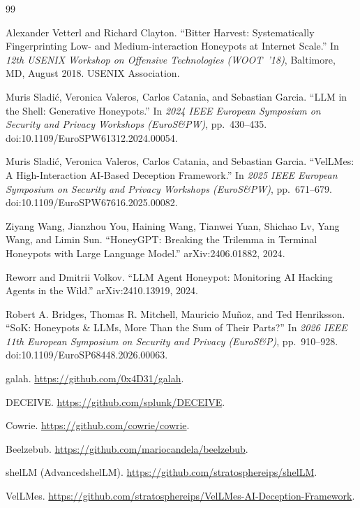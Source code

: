 \documentclass[a4paper,11pt]{article}
\begin{document}
\begin{thebibliography}{99}

Alexander Vetterl and Richard Clayton. ``Bitter Harvest: Systematically
Fingerprinting Low- and Medium-interaction Honeypots at Internet Scale.'' In
\emph{12th USENIX Workshop on Offensive Technologies (WOOT~'18)}, Baltimore,
MD, August 2018. USENIX Association.

Muris Sladi\'c, Veronica Valeros, Carlos Catania, and Sebastian Garcia. ``LLM in
the Shell: Generative Honeypots.'' In \emph{2024 IEEE European Symposium on
Security and Privacy Workshops (EuroS\&PW)}, pp.~430--435.
doi:10.1109/EuroSPW61312.2024.00054.

Muris Sladi\'c, Veronica Valeros, Carlos Catania, and Sebastian Garcia.
``VelLMes: A High-Interaction AI-Based Deception Framework.'' In \emph{2025
IEEE European Symposium on Security and Privacy Workshops (EuroS\&PW)}, pp.~671--679.
doi:10.1109/EuroSPW67616.2025.00082.

Ziyang Wang, Jianzhou You, Haining Wang, Tianwei Yuan, Shichao Lv, Yang Wang,
and Limin Sun. ``HoneyGPT: Breaking the Trilemma in Terminal Honeypots with
Large Language Model.'' arXiv:2406.01882, 2024.

Reworr and Dmitrii Volkov. ``LLM Agent Honeypot: Monitoring AI Hacking Agents in
the Wild.'' arXiv:2410.13919, 2024.

Robert A. Bridges, Thomas R. Mitchell, Mauricio Mu\~noz, and Ted Henriksson.
``SoK: Honeypots \& LLMs, More Than the Sum of Their Parts?'' In \emph{2026 IEEE
11th European Symposium on Security and Privacy (EuroS\&P)}, pp.~910--928.
doi:10.1109/EuroSP68448.2026.00063.

galah. \url{https://github.com/0x4D31/galah}.

DECEIVE. \url{https://github.com/splunk/DECEIVE}.

Cowrie. \url{https://github.com/cowrie/cowrie}.

Beelzebub. \url{https://github.com/mariocandela/beelzebub}.

shelLM (AdvancedshelLM). \url{https://github.com/stratosphereips/shelLM}.

VelLMes. \url{https://github.com/stratosphereips/VelLMes-AI-Deception-Framework}.

\end{thebibliography}
\end{document}
